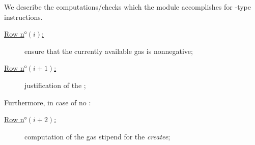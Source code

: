 We describe the computations/checks which the \stpMod{} module accomplishes for -type instructions.
\begin{description}
        \item[\colorbox{solarized-orange}{\underline{Row n$°(i)$:}}] ensure that the currently available gas is nonnegative;
        \item[\colorbox{solarized-orange}{\underline{Row n$°(i + 1)$:}}] justification of the \oogX{};
\end{description}
Furthermore, in case of no \oogxSH{}:
\begin{description}
        \item[\colorbox{solarized-green} {\underline{Row n$°(i + 2)$:}}] computation of the gas stipend for the \emph{createe};
\end{description}
